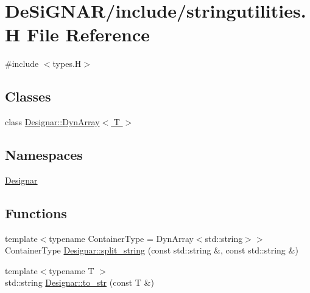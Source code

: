 \hypertarget{stringutilities_8_h}{}\section{De\+Si\+G\+N\+A\+R/include/stringutilities.H File Reference}
\label{stringutilities_8_h}
{\ttfamily \#include $<$types.\+H$>$}\newline
\subsection*{Classes}
\begin{DoxyCompactItemize}
\item 
class \hyperlink{class_designar_1_1_dyn_array}{Designar\+::\+Dyn\+Array$<$ T $>$}
\end{DoxyCompactItemize}
\subsection*{Namespaces}
\begin{DoxyCompactItemize}
\item 
 \hyperlink{namespace_designar}{Designar}
\end{DoxyCompactItemize}
\subsection*{Functions}
\begin{DoxyCompactItemize}
\item 
{\footnotesize template$<$typename Container\+Type  = Dyn\+Array$<$std\+::string$>$$>$ }\\Container\+Type \hyperlink{namespace_designar_aa31b131e36bd60bc3512a13ed11c8501}{Designar\+::split\+\_\+string} (const std\+::string \&, const std\+::string \&)
\item 
{\footnotesize template$<$typename T $>$ }\\std\+::string \hyperlink{namespace_designar_a3a65054e43d88058112c15679b43c4e4}{Designar\+::to\+\_\+str} (const T \&)
\end{DoxyCompactItemize}
